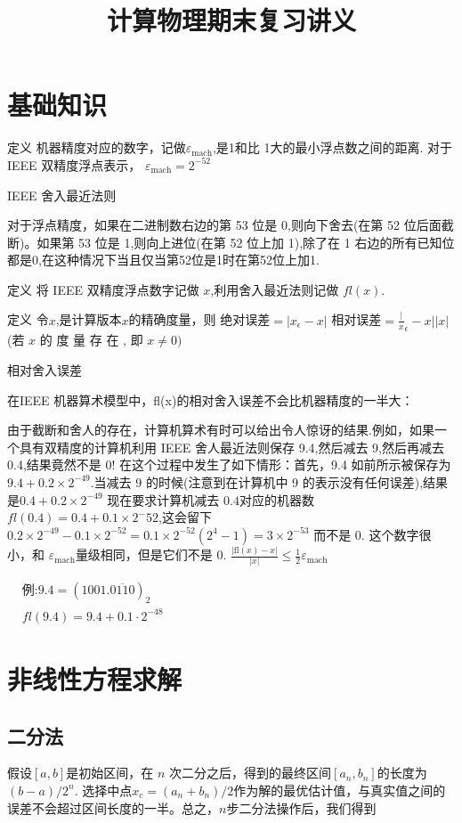 \documentclass[UTF8,5pt,a4paper]{ctexart} %
\date{}
\title{计算物理期末复习讲义}
\begin{document}
\tiny %
\begin{multicols}{4}
    \section{基础知识}
    定义 机器精度对应的数字，记做$\varepsilon_\mathrm{mach}$,是1和比 1大的最小浮点数之间的距离.
对于 IEEE 双精度浮点表示，
$\varepsilon_\mathrm{mach}=2^{-52}$

IEEE 舍入最近法则

对于浮点精度，如果在二进制数右边的第 53 位是 0,则向下舍去(在第 52 位后面截断)。如果第 53 位是 1,则向上进位(在第 52 位上加 1),除了在 1 右边的所有已知位都是0,在这种情况下当且仅当第52位是1时在第52位上加1.

定义  将 IEEE 双精度浮点数字记做 $x$,利用舍入最近法则记做 $fl(x)$.

定义  令$x$,是计算版本$x$的精确度量，则
绝对误差$=|x_\epsilon-x|$
相对误差$= \frac | x_{\epsilon }- x| {| x| }$ (若 $x$ 的 度 量 存 在 , 即  $x\neq 0)$

相对舍入误差

在IEEE 机器算术模型中，fl(x)的相对舍入误差不会比机器精度的一半大：

由于截断和舍人的存在，计算机算术有时可以给出令人惊讶的结果.例如，如果一个具有双精度的计算机利用 IEEE 舍人最近法则保存 9.4,然后减去 9,然后再减去 0.4,结果竟然不是 0! 在这个过程中发生了如下情形：首先，9.4 如前所示被保存为$9.4+0.2\times2^{-49}.$当减去 9 的时候(注意到在计算机中 9 的表示没有任何误差),结果是$ 0.4+0.2×2^{-49}$ 现在要求计算机减去 $0.4$对应的机器数 $fl(0.4)=0.4+0.1×2^-52$,这会留下
$0.2\times2^{-49}-0.1\times2^{-52}=0.1\times2^{-52}(2^{4}-1)=3\times2^{-53}$
而不是 0. 这个数字很小，和 $\varepsilon_\mathrm{mach}$量级相同，但是它们不是 0.
$\frac{|\mathrm{fl}(x)-x|}{|x|}\leq\frac12\varepsilon_{\mathrm{mach}}$ 

$\begin{aligned}
    &\text{例:}9.4=(1001.\overline{0110})_{2}\\
    &fl(9.4) =9.4+0.1\cdot2^{-48}
    \end{aligned}$
\section{非线性方程求解}
\subsection{二分法}
假设$[a,b]$是初始区间，在 $n$ 次二分之后，得到的最终区间$[a_n,b_n]$的长度为$(b-a)/2^n.$ 选择中点$x_c=(a_n+b_n)/2$作为解的最优估计值，与真实值之间的误差不会超过区间长度的一半。总之，$n$步二分法操作后，我们得到


\end{multicols}
\end{document}

